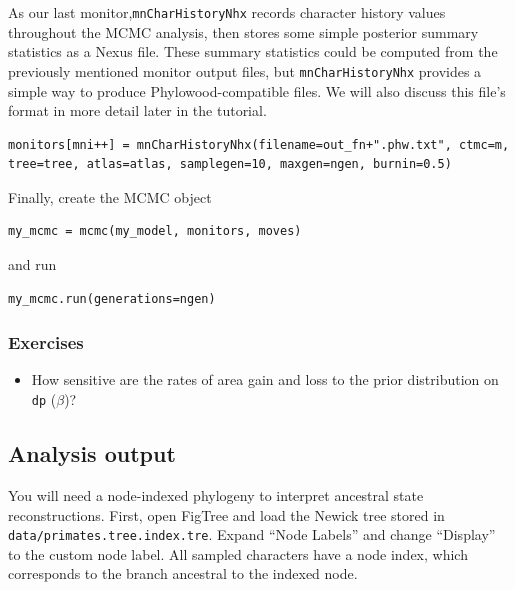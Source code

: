 As our last monitor,{\tt mnCharHistoryNhx} records character history values throughout the MCMC analysis, then stores some simple posterior summary statistics as a Nexus file.
These summary statistics could be computed from the previously mentioned monitor output files, but {\tt mnCharHistoryNhx} provides a simple way to produce Phylowood-compatible files.
We will also discuss this file's format in more detail later in the tutorial.

\begin{snugshade}
\begin{lstlisting}
monitors[mni++] = mnCharHistoryNhx(filename=out_fn+".phw.txt", ctmc=m, tree=tree, atlas=atlas, samplegen=10, maxgen=ngen, burnin=0.5)
\end{lstlisting}
\end{snugshade}

Finally, create the MCMC object

\begin{snugshade}
\begin{lstlisting}
my_mcmc = mcmc(my_model, monitors, moves)
\end{lstlisting}
\end{snugshade}

and run

\begin{snugshade}
\begin{lstlisting}
my_mcmc.run(generations=ngen)
\end{lstlisting}
\end{snugshade}

\subsubsection{Exercises}

\begin{itemize}
\item How sensitive are the rates of area gain and loss to the prior distribution on {\tt dp} ($\beta$)?
\end{itemize}

\subsection{Analysis output}

You will need a node-indexed phylogeny to interpret ancestral state reconstructions. First, open FigTree and load the Newick tree stored in {\tt data/primates.tree.index.tre}. Expand ``Node Labels'' and change ``Display'' to the custom node label. All sampled characters have a node index, which corresponds to the branch ancestral to the indexed node.

